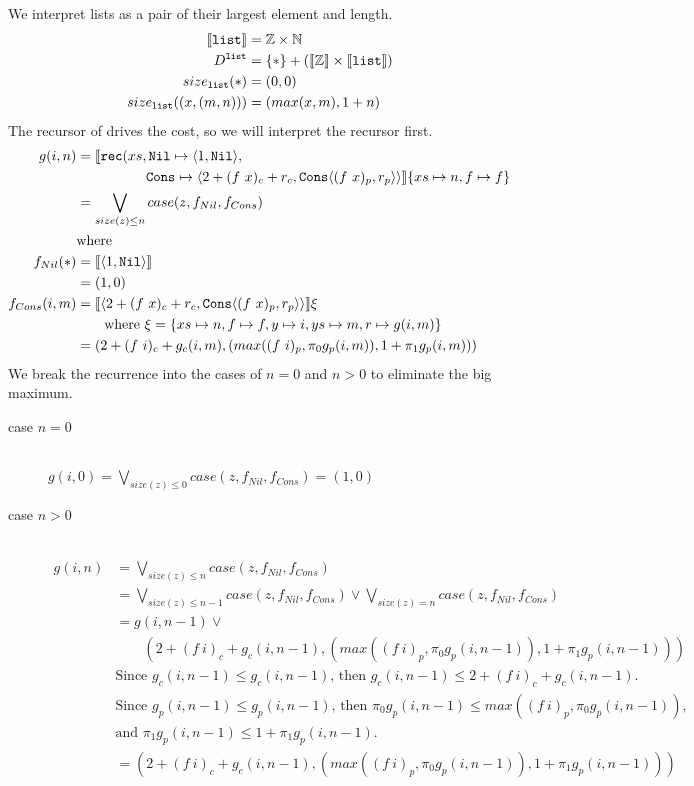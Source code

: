 We interpret lists as a pair of their largest element and length.
%
\begin{align*}
  \llbracket \texttt{list} \rrbracket &= \mathbb{Z} \times \mathbb{N} \\
  D^{\texttt{list}} &= \{*\} + (\llbracket \mathbb{Z} \rrbracket \times \llbracket \texttt{list} \rrbracket) \\
  size_{\texttt{list}}(*) &= (0, 0) \\
  size_{\texttt{list}}((x, (m, n))) &= (max(x, m), 1 + n)
\end{align*}
%
The recursor of  drives the cost, so we will interpret the recursor
first.
%
\begin{align*}
  g(i, n) &= \LB \T{rec}(xs, \T{Nil} \mapsto \LP 1,\T{Nil}\RP, \\
       &\quadfive \T{Cons} \mapsto \LP 2 + (f\ x)_c + r_c,\T{Cons}\LP (f\ x)_p,r_p\RP\RP \RB \{xs \mapsto n, f \mapsto f\}\\
       &= \bigvee\limits_{size(z) \leq n} case(z, f_{Nil}, f_{Cons}) \\
       &\text{where} \\
  f_{Nil}(\ast) &= \LB \LP 1,\T{Nil}\RP\RB \\
                &= (1,0) \\
  f_{Cons}(i, m) &= \LB \LP 2 + (f\ x)_c + r_c,\T{Cons}\LP (f\ x)_p,r_p\RP\RP\RB \xi\\
                 &\qquad \text{where } \xi = \{xs \mapsto n, f \mapsto f, y \mapsto i, ys \mapsto m, r \mapsto g(i, m) \} \\
                 &= (2 + (f\ i)_c + g_c(i,m), (max((f\ i)_p, \pi_0g_p(i,m)), 1 + \pi_1 g_p(i,m)))
\end{align*}
%
We break the recurrence into the cases of $n=0$ and $n>0$ to eliminate the big maximum.
%
\begin{description}
  \item[case $n=0$]\hfill \\
    $g(i,0) = \bigvee\limits_{size(z) \leq 0} case(z, f_{Nil}, f_{Cons}) = (1,0)$
  \item[case $n>0$]\hfill \\
    \begin{align*}
      g(i,n) &= \bigvee\limits_{size(z) \leq n} case(z, f_{Nil}, f_{Cons}) \\
             &= \bigvee\limits_{size(z) \leq n-1} case(z,f_{Nil},f_{Cons}) \vee \bigvee\limits_{size(z) = n} case(z,f_{Nil}, f_{Cons}) \\
             &= g(i,n-1) \vee \\
             &\qquad (2 + (f\ i)_c + g_c(i,n-1), (max((f\ i)_p,\pi_0g_p(i,n-1)), 1 + \pi_1 g_p(i,n-1))) \\
             &\text{Since $g_c(i,n-1) \leq g_c(i,n-1)$, then $g_c(i,n-1)\leq 2 + (f\ i)_c + g_c(i,n-1)$.} \\
             &\text{Since $g_p(i,n-1) \leq g_p(i,n-1)$, then $\pi_0 g_p(i,n-1) \leq max((f\ i)_p, \pi_0g_p(i,n-1))$,} \\
             &\text{and $\pi_1 g_p(i,n-1) \leq 1 + \pi_1 g_p(i,n-1)$.} \\
             &= (2 + (f\ i)_c + g_c(i,n-1), (max((f\ i)_p,\pi_0g_p(i,n-1)), 1 + \pi_1 g_p(i,n-1))) \\
    \end{align*}
\end{description}
